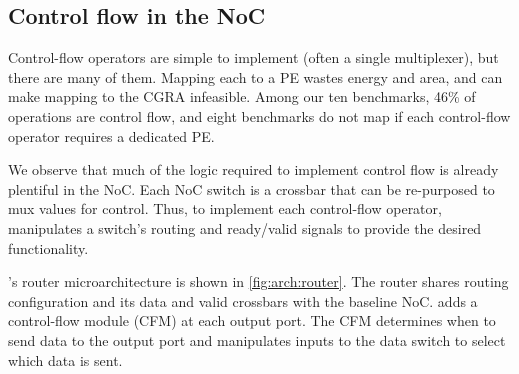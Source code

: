 \subsection{Control flow in the NoC}
\label{sec:fin}

Control-flow operators are simple to implement (often a single
multiplexer), but there are many of them.
%
Mapping each to a PE wastes energy and area, and can make mapping
to the CGRA infeasible.
%
Among our ten benchmarks,
46\% of operations are control flow,
and eight benchmarks do not map if each control-flow operator requires a dedicated PE.

We observe that much of the logic required to implement control flow is already
plentiful in the NoC.
%
Each NoC switch is a crossbar that can be re-purposed to mux values for
control.
%
Thus, to implement each control-flow operator, \riptide manipulates a switch's
routing and ready/valid signals to provide the desired functionality.

\riptide's router microarchitecture is shown in \autoref{fig:arch:router}.
% 
The router shares routing configuration and its data and valid crossbars with
the baseline NoC.
%
\riptide adds a control-flow module (CFM) at each output port.
% 
The CFM determines when to send data to the output port and
manipulates inputs to the data switch to select which data is sent.



